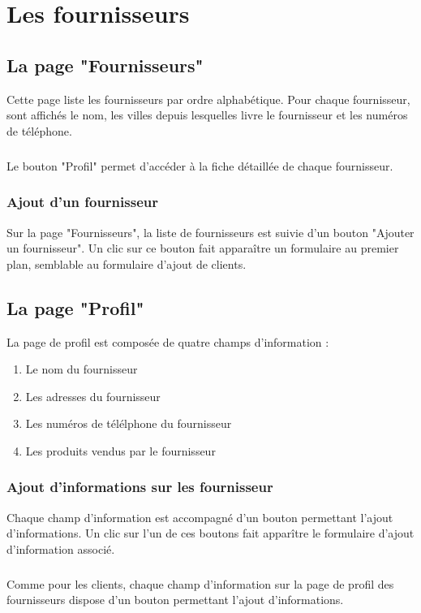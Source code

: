 \chapter{Les fournisseurs}

\section{La page "Fournisseurs"}
Cette page liste les fournisseurs par ordre alphabétique. Pour chaque fournisseur, sont
affichés le nom, les villes depuis lesquelles livre le fournisseur et
les numéros de téléphone.

\paragraph{}
Le bouton "Profil" permet d'accéder à la fiche détaillée de chaque fournisseur.

\subsection{Ajout d'un fournisseur}
Sur la page "Fournisseurs", la liste de fournisseurs est suivie d'un bouton
"Ajouter un fournisseur". Un clic sur ce bouton fait apparaître un formulaire au
premier plan, semblable au formulaire d'ajout de clients.

\section{La page "Profil"}
La page de profil est composée de quatre champs d'information :

\begin{enumerate}
  \item Le nom du fournisseur
  \item Les adresses du fournisseur
  \item Les numéros de télélphone du fournisseur
  \item Les produits vendus par le fournisseur
\end{enumerate}

\subsection{Ajout d'informations sur les fournisseur}
Chaque champ d'information est accompagné d'un bouton permettant l'ajout d'informations.
Un clic sur l'un de ces boutons fait apparître le formulaire d'ajout
d'information associé.

\paragraph{}
Comme pour les clients, chaque champ d'information sur la page de profil
des fournisseurs dispose
d'un bouton permettant l'ajout d'informations.

